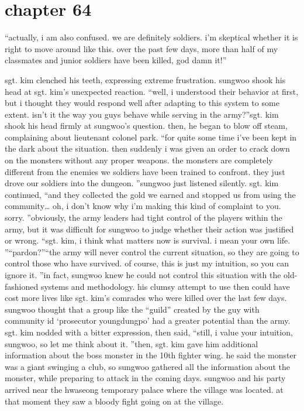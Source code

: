 \section{chapter 64}

                            “actually, i am also confused.
 we are definitely soldiers.
 i’m skeptical whether it is right to move around like this.
 over the past few days, more than half of my classmates and junior soldiers have been killed, god damn it!”




sgt.
 kim clenched his teeth, expressing extreme frustration.
 sungwoo shook his head at sgt.
 kim’s unexpected reaction.
“well, i understood their behavior at first, but i thought they would respond well after adapting to this system to some extent.
 isn’t it the way you guys behave while serving in the army?”sgt.
 kim shook his head firmly at sungwoo’s question.
then, he began to blow off steam, complaining about lieutenant colonel park.
“for quite some time i’ve been kept in the dark about the situation.
 then suddenly i was given an order to crack down on the monsters without any proper weapons.
 the monsters are completely different from the enemies we soldiers have been trained to confront.
 they just drove our soldiers into the dungeon.
”sungwoo just listened silently.
sgt.
 kim continued, “and they collected the gold we earned and stopped us from using the community… oh, i don’t know why i’m making this kind of complaint to you.
 sorry.
”obviously, the army leaders had tight control of the players within the army, but it was difficult for sungwoo to judge whether their action was justified or wrong.
“sgt.
 kim, i think what matters now is survival.
 i mean your own life.
”“pardon?”“the army will never control the current situation, so they are going to control those who have survived.
 of course, this is just my intuition, so you can ignore it.
”in fact, sungwoo knew he could not control this situation with the old-fashioned systems and methodology.
 his clumsy attempt to use then could have cost more lives like sgt.
 kim’s comrades who were killed over the last few days.
sungwoo thought that a group like the “guild” created by the guy with community id ‘prosecutor youngdungpo’ had a greater potential than the army.
sgt.
 kim nodded with a bitter expression, then said, “still, i value your intuition, sungwoo, so let me think about it.
”then, sgt.
 kim gave him additional information about the boss monster in the 10th fighter wing.
 he said the monster was a giant swinging a club, so sungwoo gathered all the information about the monster, while preparing to attack in the coming days.
sungwoo and his party arrived near the hwaseong temporary palace where the village was located.
 at that moment they saw a bloody fight going on at the village.

